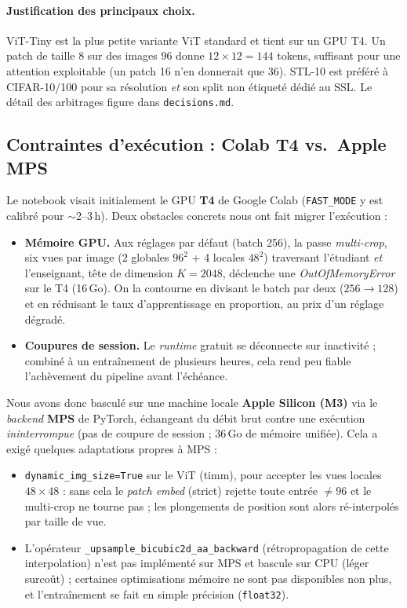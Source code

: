 \documentclass[11pt,a4paper]{article}
\begin{document}
\paragraph{Justification des principaux choix.} ViT-Tiny est la plus petite variante ViT standard
et tient sur un GPU T4. Un patch de taille 8 sur des images $96$ donne $12\times12=144$ tokens,
suffisant pour une attention exploitable (un patch 16 n'en donnerait que 36). STL-10 est préféré
à CIFAR-10/100 pour sa résolution \emph{et} son split non étiqueté dédié au SSL. Le détail des
arbitrages figure dans \texttt{decisions.md}.

\subsection{Contraintes d'exécution : Colab T4 vs.\ Apple MPS}
Le notebook visait initialement le GPU \textbf{T4} de Google Colab (\texttt{FAST\_MODE} y est calibré
pour $\sim$2--3\,h). Deux obstacles concrets nous ont fait migrer l'exécution :
\begin{itemize}[nosep]
  \item \textbf{Mémoire GPU.} Aux réglages par défaut (batch 256), la passe \emph{multi-crop},
  six vues par image (2 globales $96^2$ + 4 locales $48^2$) traversant l'étudiant \emph{et}
  l'enseignant, tête de dimension $K=2048$, déclenche une \emph{OutOfMemoryError} sur le T4
  (16\,Go). On la contourne en divisant le batch par deux ($256\to128$) et en réduisant le taux
  d'apprentissage en proportion, au prix d'un réglage dégradé.
  \item \textbf{Coupures de session.} Le \emph{runtime} gratuit se déconnecte sur inactivité ;
  combiné à un entraînement de plusieurs heures, cela rend peu fiable l'achèvement du pipeline avant
  l'échéance.
\end{itemize}
Nous avons donc basculé sur une machine locale \textbf{Apple Silicon (M3)} via le \emph{backend}
\textbf{MPS} de PyTorch, échangeant du débit brut contre une exécution \emph{ininterrompue} (pas de
coupure de session ; 36\,Go de mémoire unifiée). Cela a exigé quelques adaptations propres à MPS :
\begin{itemize}[nosep]
  \item \texttt{dynamic\_img\_size=True} sur le ViT (timm), pour accepter les vues locales
  $48\times48$ : sans cela le \emph{patch embed} (strict) rejette toute entrée $\neq 96$ et le
  multi-crop ne tourne pas ; les plongements de position sont alors ré-interpolés par taille de vue.
  \item L'opérateur \texttt{\_upsample\_bicubic2d\_aa\_backward} (rétropropagation de cette
  interpolation) n'est pas implémenté sur MPS et bascule sur CPU (léger surcoût) ; certaines
  optimisations mémoire ne sont pas disponibles non plus, et l'entraînement se fait en simple
  précision (\texttt{float32}).
\end{itemize}
\end{document}

